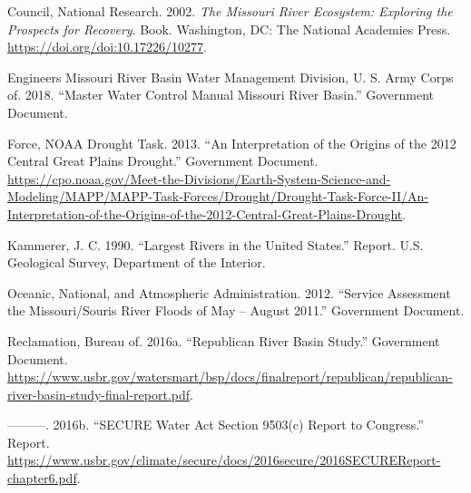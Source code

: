 \documentclass[12pt,]{article}
\begin{document}
\hypertarget{refs}{}
\leavevmode\hypertarget{ref-nrc2002}{}%
Council, National Research. 2002. \emph{The Missouri River Ecosystem:
Exploring the Prospects for Recovery}. Book. Washington, DC: The
National Academies Press. \url{https://doi.org/doi:10.17226/10277}.

\leavevmode\hypertarget{ref-usace2018}{}%
Engineers Missouri River Basin Water Management Division, U. S. Army
Corps of. 2018. ``Master Water Control Manual Missouri River Basin.''
Government Document.

\leavevmode\hypertarget{ref-noaa2013}{}%
Force, NOAA Drought Task. 2013. ``An Interpretation of the Origins of
the 2012 Central Great Plains Drought.'' Government Document.
\url{https://cpo.noaa.gov/Meet-the-Divisions/Earth-System-Science-and-Modeling/MAPP/MAPP-Task-Forces/Drought/Drought-Task-Force-II/An-Interpretation-of-the-Origins-of-the-2012-Central-Great-Plains-Drought}.

\leavevmode\hypertarget{ref-kammerer1990}{}%
Kammerer, J. C. 1990. ``Largest Rivers in the United States.'' Report.
U.S. Geological Survey, Department of the Interior.

\leavevmode\hypertarget{ref-noaa2012}{}%
Oceanic, National, and Atmospheric Administration. 2012. ``Service
Assessment the Missouri/Souris River Floods of May -- August 2011.''
Government Document.

\leavevmode\hypertarget{ref-bor2016-2}{}%
Reclamation, Bureau of. 2016a. ``Republican River Basin Study.''
Government Document.
\url{https://www.usbr.gov/watersmart/bsp/docs/finalreport/republican/republican-river-basin-study-final-report.pdf}.

\leavevmode\hypertarget{ref-bor2016-1}{}%
---------. 2016b. ``SECURE Water Act Section 9503(c) Report to
Congress.'' Report.
\url{https://www.usbr.gov/climate/secure/docs/2016secure/2016SECUREReport-chapter6.pdf}.
\end{document}

